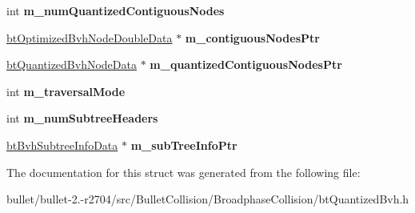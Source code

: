 \begin{DoxyCompactItemize}
\item 
\hypertarget{structbt_quantized_bvh_double_data_acc18a222b5c81f088465956e3ca4ea94}{int {\bfseries m\+\_\+num\+Quantized\+Contiguous\+Nodes}}\label{structbt_quantized_bvh_double_data_acc18a222b5c81f088465956e3ca4ea94}

\item 
\hypertarget{structbt_quantized_bvh_double_data_af1a15fa43d9dc3b15ce4435598e07e75}{\hyperlink{structbt_optimized_bvh_node_double_data}{bt\+Optimized\+Bvh\+Node\+Double\+Data} $\ast$ {\bfseries m\+\_\+contiguous\+Nodes\+Ptr}}\label{structbt_quantized_bvh_double_data_af1a15fa43d9dc3b15ce4435598e07e75}

\item 
\hypertarget{structbt_quantized_bvh_double_data_ae02179e6b40e6d623fb60462d1d57e33}{\hyperlink{structbt_quantized_bvh_node_data}{bt\+Quantized\+Bvh\+Node\+Data} $\ast$ {\bfseries m\+\_\+quantized\+Contiguous\+Nodes\+Ptr}}\label{structbt_quantized_bvh_double_data_ae02179e6b40e6d623fb60462d1d57e33}

\item 
\hypertarget{structbt_quantized_bvh_double_data_a42c77f3965294fa766714eba6bb52c41}{int {\bfseries m\+\_\+traversal\+Mode}}\label{structbt_quantized_bvh_double_data_a42c77f3965294fa766714eba6bb52c41}

\item 
\hypertarget{structbt_quantized_bvh_double_data_a1a942c5875b6979fc4b0aced16546e15}{int {\bfseries m\+\_\+num\+Subtree\+Headers}}\label{structbt_quantized_bvh_double_data_a1a942c5875b6979fc4b0aced16546e15}

\item 
\hypertarget{structbt_quantized_bvh_double_data_a53369593853a504b5545bc7fe329757d}{\hyperlink{structbt_bvh_subtree_info_data}{bt\+Bvh\+Subtree\+Info\+Data} $\ast$ {\bfseries m\+\_\+sub\+Tree\+Info\+Ptr}}\label{structbt_quantized_bvh_double_data_a53369593853a504b5545bc7fe329757d}

\end{DoxyCompactItemize}


The documentation for this struct was generated from the following file\+:\begin{DoxyCompactItemize}
\item 
bullet/bullet-\/2.-\/r2704/src/\+Bullet\+Collision/\+Broadphase\+Collision/bt\+Quantized\+Bvh.\+h\end{DoxyCompactItemize}
